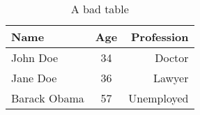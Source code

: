 
\begin{table}[h] \cite{}
\centering %
\begin{tabular}{|l|c|r|}
\hline
Name & Age & Profession\\
\hline
John Doe & 34 & Doctor\\
\hline
Jane Doe & 36 & Lawyer\\
\hline
Barack Obama & 57 & Unemployed\\
\hline
\end{tabular}
\caption{A bad table}
\label{tab:bad}
\end{table}



